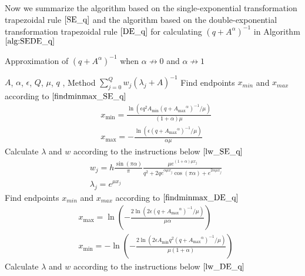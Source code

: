 Now we summarize the algorithm based on the single-exponential transformation trapezoidal rule $\eqref{SE_q}$ and the algorithm based on the double-exponential transformation trapezoidal rule $\eqref{DE_q}$  for calculating $(q+A^{\alpha})^{-1}$ in Algorithm $\ref{alg:SEDE_q}$
\begin{algorithm}[!h]
	\caption{Approximation of $(q+A^{\alpha})^{-1}$ when $\alpha \not \rightarrow 0$ and $\alpha \not \rightarrow 1$}
	\label{alg:SEDE_q}
	\renewcommand{\algorithmicrequire}{\textbf{Input:}}
	\renewcommand{\algorithmicensure}{\textbf{Output:}}
	\begin{algorithmic}[1]
		\REQUIRE $A$, $\alpha$, $\epsilon$, $Q$, $\mu$, $q$ , Method %
		\ENSURE $\sum_{j=0}^{Q}w_j(\lambda_j+A)^{-1}$    %
		\STATE  Find endpoints $x_{min}$ and $x_{max}$ according to $\eqref{findminmax_SE_q}$\\
		\begin{equation*}
			\begin{aligned}
				&x_{\min}= \frac{\ln(\epsilon q^2 A_{\min} (q+{A_{\max}}^{\alpha})^{-1}/\mu)}{(1+\alpha)\mu}\\
				&x_{\max}=-\frac{\ln(\epsilon (q+{A_{\max}}^{\alpha})^{-1}/\mu)}{\alpha \mu}
			\end{aligned}
		\end{equation*}
		\STATE  Calculate $\lambda$ and $w$ according to the instructions below $\eqref{lw_SE_q}$\\
		\begin{equation*}
			\begin{aligned}
				&w_j=h\frac{\sin(\pi \alpha)}{\pi}\frac{\mu e^{(1+\alpha)\mu x_j}}{q^2+2qe^{\alpha \mu x_j}\cos(\pi\alpha)+e^{2\alpha \mu x_j}}\\
				&\lambda_j=e^{\mu x_j}
			\end{aligned}
		\end{equation*}
		\ELSE[Method==DE]
		\STATE  Find endpoints $x_{min}$ and $x_{max}$ according to $\eqref{findminmax_DE_q}$\\
		\begin{equation*}
			\begin{aligned}
				&x_{\max}=\ln\left(-\frac{2\ln(2\epsilon  (q+{A_{\max}}^{\alpha})^{-1}/\mu)}{\mu \alpha}\right)\\
				&x_{\min}=-\ln\left(-\frac{2\ln(2\epsilon A_{\min} q^2  (q+{A_{\max}}^{\alpha})^{-1}/\mu)}{\mu(1+\alpha)}\right)
			\end{aligned}
		\end{equation*}
		\STATE  Calculate $\lambda$ and $w$ according to the instructions below $\eqref{lw_DE_q}$\\

\end{algorithmic}
\end{algorithm}
